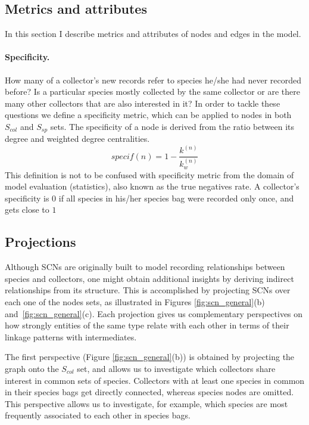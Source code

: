
\subsection{Metrics and attributes}
In this section I describe metrics and attributes of nodes and edges in the model.

\paragraph*{Specificity.} 
How many of a collector's new records refer to species he/she had never recorded before?
Is a particular species mostly collected by the same collector or are there many other collectors that are also interested in it?
In order to tackle these questions we define a specificity metric, which can be applied to nodes in both $S_{col}$ and $S_{sp}$ sets. 
The specificity of a node is derived from the ratio between its degree and weighted degree centralities.
\begin{equation}
specif(n) = 1-\frac{k^{(n)}}{k_w^{(n)}}
\end{equation}
This definition is not to be confused with specificity metric from the domain of model evaluation (statistics), also known as the true negatives rate.
A collector's specificity is $0$ if all species in his/her species bag were recorded only once, and gets close to $1$


\subsection{Projections}

Although SCNs are originally built to model recording relationships between species and collectors, one might obtain additional insights by deriving indirect relationships from its structure. This is accomplished by projecting SCNs over each one of the nodes sets, as illustrated in Figures \ref{fig:scn_general}(b)
and~\ref{fig:scn_general}(c). Each projection gives us complementary perspectives on how strongly entities of the same type relate with each other in terms of their linkage patterns with intermediates.


The first perspective (Figure \ref{fig:scn_general}(b)) is obtained by projecting the graph onto the $S_{col}$ set, and allows us to investigate which collectors share interest in common sets of species. Collectors with at least one species in common in their species bags get directly connected, whereas species nodes are omitted. This perspective allows us to investigate, for example, which species are most frequently associated to each other in species bags.%

